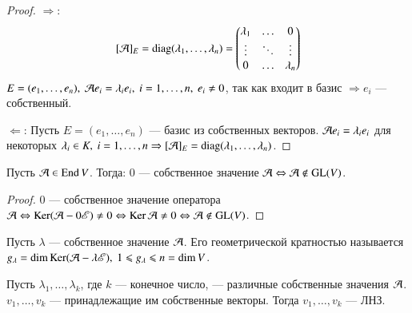 \documentclass[main]{subfiles}
\begin{document}
\begin{proof}
    $\Rightarrow$:
    \[ [\mathcal{A}]_E = \operatorname{diag}(\lambda_1, \ldots, \lambda_n) = \begin{pmatrix}
            \lambda_1 & \ldots & 0         \\
            \vdots    & \ddots & \vdots    \\
            0         & \ldots & \lambda_n \\
        \end{pmatrix}\]
    $ E = (e_1, \ldots, e_n),\ \mathcal{A} e_i = \lambda_i e_i,\ i = 1, \ldots, n,\ e_i \neq 0 $,
    так как входит в базис $\Rightarrow e_i$ — собственный.

    $\Leftarrow$: Пусть  $E = (e_1, \ldots, e_n)$ — базис из собственных векторов.
    $\mathcal{A} e_i = \lambda_i e_i$ для некоторых $\lambda_i \in K, \ i = 1, \ldots, n
        \Rightarrow [\mathcal{A}]_E
        = \operatorname{diag}(\lambda_1, \ldots, \lambda_n)$.
\end{proof}

\begin{lemma}
    Пусть $\mathcal{A} \in \operatorname{End} V$. Тогда: 0 — собственное значение $\mathcal{A}
        \Leftrightarrow \mathcal{A} \not\in \operatorname{GL}(V)$.
\end{lemma}

\begin{proof}
    0 — собственное значение оператора $\mathcal{A} \Leftrightarrow
        \operatorname{Ker} (\mathcal{A} - 0\mathscr{E}) \neq 0 \Leftrightarrow
        \operatorname{Ker} \mathcal{A} \neq 0 \Leftrightarrow \mathcal{A} \not\in \operatorname{GL}(V)$.
\end{proof}

\begin{definition} 
    Пусть $\lambda$ — собственное значение $\mathcal{A}$.
    Его геометрической кратностью называется
    $g_\lambda = \dim \operatorname{Ker} (\mathcal{A} -\lambda\mathscr{E}),\ 1 \leqslant g_\lambda \leqslant n = \dim V$.
\end{definition}

\begin{proposition}
    Пусть $\lambda_1, \ldots, \lambda_k$, где $k$ — конечное число, — различные собственные значения $\mathcal{A}$.
    $v_1, \ldots, v_k$ — принадлежащие им собственные векторы.
    Тогда  $v_1, \ldots, v_k$ — ЛНЗ.
\end{proposition}
\end{document}
